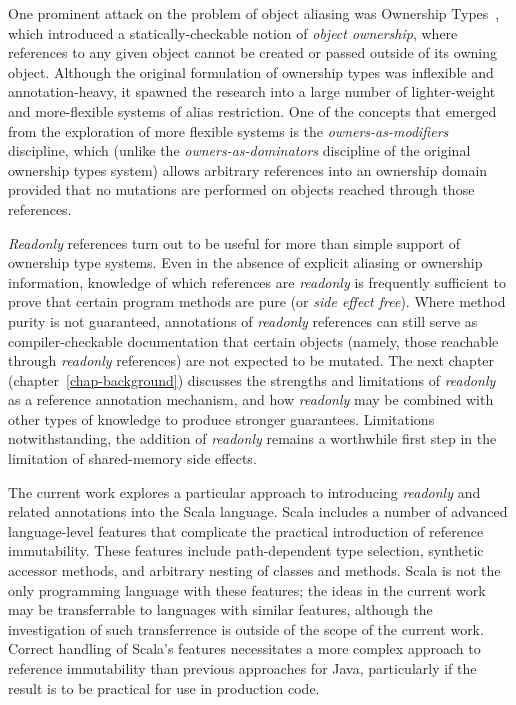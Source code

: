 \documentclass[11pt]{report}
\begin{document}
One prominent attack on the problem of object aliasing was Ownership Types~\cite{ownership-types},
which introduced a statically-checkable notion of {\em object ownership},
where references to any given object cannot be created or passed outside of its owning object.
Although the original formulation of ownership types was inflexible
and annotation-heavy, it spawned the research into a large number of
lighter-weight and more-flexible systems of alias restriction.
One of the concepts that emerged from the exploration of more flexible systems
is the {\em owners-as-modifiers} discipline, which (unlike the
{\em owners-as-dominators} discipline of the original ownership types system)
allows arbitrary references into an ownership domain provided that
no mutations are performed on objects reached through those references.

{\em Readonly} references turn out to be useful for more than simple support of
ownership type systems.
Even in the absence of explicit aliasing or ownership information,
knowledge of which references are {\em readonly} is frequently sufficient to
prove that certain program methods are pure (or {\em side effect free}).
Where method purity is not guaranteed,
annotations of {\em readonly} references can still serve as compiler-checkable documentation
that certain objects (namely, those reachable through {\em readonly} references) are
not expected to be mutated.
The next chapter (chapter~\ref{chap-background}) discusses the strengths and limitations
of {\em readonly} as a reference annotation mechanism, and how {\em readonly} may be
combined with other types of knowledge to produce stronger guarantees.
Limitations notwithstanding, the addition of {\em readonly} remains a
worthwhile first step in the limitation of shared-memory side effects.

The current work explores a particular approach to introducing {\em readonly}
and related annotations into the Scala language.
Scala includes a number of advanced language-level features that complicate
the practical introduction of reference immutability.
These features include path-dependent type selection, synthetic accessor methods,
and arbitrary nesting of classes and methods.
Scala is not the only programming language with these features;
the ideas in the current work may be transferrable to languages with
similar features, although the investigation of such transferrence is
outside of the scope of the current work.
Correct handling of Scala's features necessitates a more complex approach to
reference immutability than previous approaches for Java,
particularly if the result is to be practical for use in production code.
\end{document}
